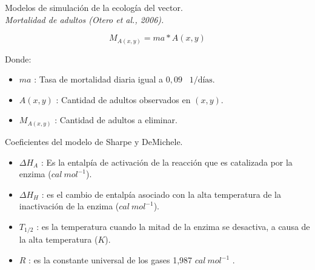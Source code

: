 {
\begin{frame}[c]{Modelos de simulación de la ecología del vector.\\\textit{Mortalidad de adultos (Otero et al., 2006).}}
  \begin{center}
    \begin{equation}
        M_{A(x,y)} = ma * A(x,y)
    \end{equation}
  \end{center}
  Donde:
    \begin{itemize}
      \item $ma$ : Tasa de mortalidad diaria igual a $0,09$ \ $1/\text{días}$.
      \item $A(x, y)$ : Cantidad de adultos observados en $(x,y)$.
      \item $M_{A(x,y)}$ : Cantidad de adultos a eliminar.
    \end{itemize}
\end{frame}
}

\begin{frame}[t]{Coeficientes del modelo de Sharpe y DeMichele.}
    \begin{itemize}
      \item $\Delta H_{A}$ : Es la entalpía de activación de la reacción que es catalizada por la enzima ($cal\ mol^{-1}$).
      \item $\Delta H_{H}$ : es el cambio de entalpía asociado con la alta temperatura de la inactivación de la enzima ($cal\ mol^{-1}$).
      \item $T_{1/2}$ : es la temperatura cuando la mitad de la enzima se desactiva, a causa de la alta temperatura ($K$).
      \item $R$ : es la constante universal de los gases 1,987 $cal\ mol^{-1}$ .
    \end{itemize}
\end{frame}

